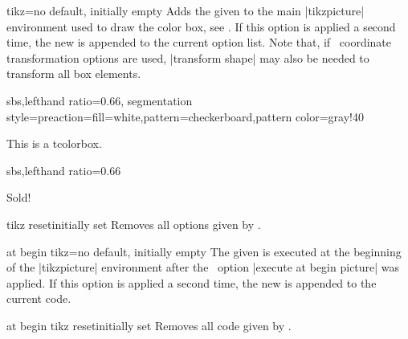 \begin{docTcbKey}{tikz}{=}{no default, initially empty}
  Adds the given  to the main |tikzpicture| environment
  used to draw the color box, see \cite{tantau:tikz_and_pgf}. If this option is
  applied a second time, the new  is appended to the
  current option list.
  Note that, if \tikzname\ coordinate transformation options are used,
  |transform shape| may also be needed to transform all box elements.
\begin{dispExample*}{sbs,lefthand ratio=0.66,
  segmentation style={preaction={fill=white},pattern=checkerboard,pattern color=gray!40}}

\begin{tcolorbox}[title=Transparent box,
  tikz={opacity=0.5,transparency group}]
This is a tcolorbox.
\end{tcolorbox}
\end{dispExample*}

\begin{dispExample*}{sbs,lefthand ratio=0.66}

\begin{tcolorbox}[title=Rotated box,
  tikz={rotate=30}]
Sold!
\end{tcolorbox}
\end{dispExample*}

\end{docTcbKey}


\begin{docTcbKey}{tikz reset}{}{initially set}
  Removes all options given by .
\end{docTcbKey}


\begin{docTcbKey}{at begin tikz}{=}{no default, initially empty}
  The given  is executed at the beginning of the |tikzpicture| environment
  after the \tikzname\  option |execute at begin picture| was applied.
  If this option is applied a second time, the new  is appended to the current code.
\end{docTcbKey}


\begin{docTcbKey}{at begin tikz reset}{}{initially set}
  Removes all code given by .
\end{docTcbKey}


